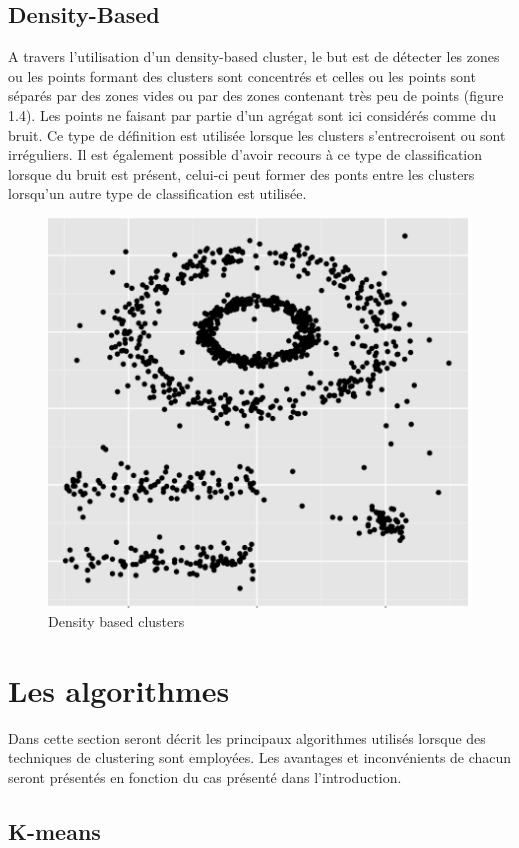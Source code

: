 \documentclass[memoire.tex]{subfiles}
\begin{document}
\subsection{Density-Based}
A travers l'utilisation d'un density-based cluster, le but est de détecter les zones ou les points formant des clusters sont concentrés et celles ou les points sont séparés par des zones vides ou par des zones contenant très peu de points (figure 1.4). Les points ne faisant par partie d'un agrégat sont ici considérés comme du bruit. Ce type de définition est utilisée lorsque les clusters s'entrecroisent ou sont irréguliers.\cite{ref4} Il est également possible d'avoir recours à ce type de classification lorsque du bruit est présent, celui-ci peut former des ponts entre les clusters lorsqu'un autre type de classification est utilisée.
	\begin{figure}[h!]
		\centerline{\includegraphics[scale=0.8]{img/density_cluster.png}}
		\caption{Density based clusters}
	\end{figure}

\newpage
\section{Les algorithmes}
Dans cette section seront décrit les principaux algorithmes utilisés lorsque des techniques de clustering sont employées. Les avantages et inconvénients de chacun seront présentés en fonction du cas présenté dans l'introduction.
\subsection{K-means}
\end{document}
